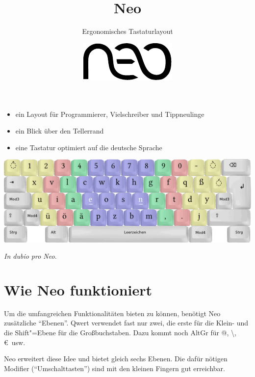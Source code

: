 \documentclass[%
  a4paper
  ,ngerman
  ,notumble,12pt,
]{leaflet}
\title{Neo}
\author{Ergonomisches Tastaturlayout}
\date{\includegraphics[height=3ex]{neo_logo}}
\begin{document}
\maketitle
\begin{itemize}%
\item ein Layout für Programmierer, Vielschreiber und Tippneulinge
\item ein Blick über den Tellerrand
\item eine Tastatur optimiert auf die deutsche Sprache
\end{itemize}%

\vfill

\includegraphics[width=\textwidth]{tastatur_neo_Ebene1}

\vfill

\begin{center}
\emph{In dubio pro Neo}.
\end{center}
\newpage
\section{Wie Neo funktioniert}
Um die umfangreichen Funktionalitäten bieten zu können, benötigt Neo zusätzliche \enquote{Ebenen}. Qwert verwendet fast nur zwei, die erste für die Klein- und die Shift"=Ebene für die Großbuchstaben. Dazu kommt noch AltGr für @, \textbackslash, \euro\ usw.

Neo erweitert diese Idee und bietet gleich sechs Ebenen. Die dafür nötigen Modifier (\enquote{Umschalttasten}) sind mit den kleinen Fingern gut erreichbar.
\end{document}
